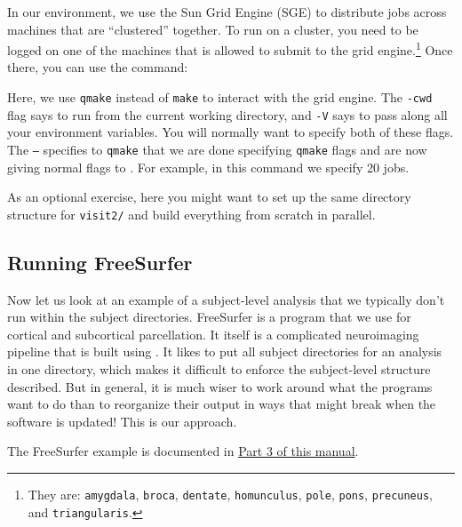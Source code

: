 In our environment, we use the Sun Grid Engine (SGE) to distribute jobs across machines that are ``clustered'' together. To run on a cluster, you need to be logged on one of the machines that is allowed to submit to the grid engine.\footnote{They are: \texttt{amygdala}, \texttt{broca}, \texttt{dentate}, \texttt{homunculus}, \texttt{pole}, \texttt{pons}, \texttt{precuneus}, and \texttt{triangularis}.} Once there, you can use the command:

Here, we use \texttt{qmake} instead of \texttt{make} to interact with the grid engine. The \texttt{-cwd} flag says to run from the current working directory, and \texttt{-V} says to pass along all your environment variables. You will normally want to specify both of these flags. The \texttt{--} specifies to \texttt{qmake} that we are done specifying \texttt{qmake} flags and are now giving normal flags to \maken{}. For example, in this command we specify 20 jobs. 

As an optional exercise, here you might want to set up the same directory structure for \texttt{visit2/} and build everything from scratch in parallel.

\subsection{Running FreeSurfer}
Now let us look at an example of a subject-level analysis that we typically don't run within the subject directories. FreeSurfer \citep[see][]{Desikan2006968, Fischl01012004, Fischl2004S69} is a program that we use for cortical and subcortical parcellation. It itself is a complicated neuroimaging pipeline that is built using \maken{}. It likes to put all subject directories for an analysis in one directory, which makes it difficult to enforce the subject-level structure described. But in general, it is much wiser to work around what the programs want to do than to reorganize their output in ways that might break when the software is updated! This is our approach.

The FreeSurfer example is documented in \hyperref[sec:freesurfer]{Part 3 of this manual}. 

